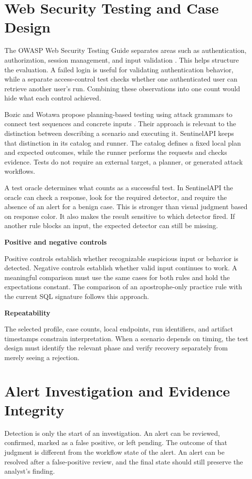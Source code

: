 \documentclass[11pt,letterpaper,oneside]{report}
\newcommand{\topic}[1]{\smallskip\noindent\textbf{#1}\par\nobreak\vspace{-.39em}}
\newcommand{\sheet}[1]{\clearpage\section{#1}}
\begin{document}
\sheet{Web Security Testing and Case Design}
The OWASP Web Security Testing Guide separates areas such as authentication, authorization, session management, and input validation \cite{owasp}. This helps structure the evaluation. A failed login is useful for validating authentication behavior, while a separate access-control test checks whether one authenticated user can retrieve another user's run. Combining these observations into one count would hide what each control achieved.

Bozic and Wotawa propose planning-based testing using attack grammars to connect test sequences and concrete inputs \cite{bozic}. Their approach is relevant to the distinction between describing a scenario and executing it. SentinelAPI keeps that distinction in its catalog and runner. The catalog defines a fixed local plan and expected outcomes, while the runner performs the requests and checks evidence. Tests do not require an external target, a planner, or generated attack workflows.

A test oracle determines what counts as a successful test. In SentinelAPI the oracle can check a response, look for the required detector, and require the absence of an alert for a benign case. This is stronger than visual judgment based on response color. It also makes the result sensitive to which detector fired. If another rule blocks an input, the expected detector can still be missing.

\topic{Positive and negative controls}
Positive controls establish whether recognizable suspicious input or behavior is detected. Negative controls establish whether valid input continues to work. A meaningful comparison must use the same cases for both rules and hold the expectations constant. The comparison of an apostrophe-only practice rule with the current SQL signature follows this approach.

\topic{Repeatability}
The selected profile, case counts, local endpoints, run identifiers, and artifact timestamps constrain interpretation. When a scenario depends on timing, the test design must identify the relevant phase and verify recovery separately from merely seeing a rejection.

\sheet{Alert Investigation and Evidence Integrity}
Detection is only the start of an investigation. An alert can be reviewed, confirmed, marked as a false positive, or left pending. The outcome of that judgment is different from the workflow state of the alert. An alert can be resolved after a false-positive review, and the final state should still preserve the analyst's finding.
\end{document}
